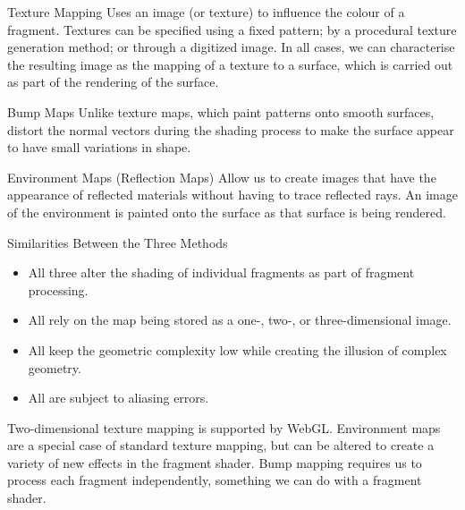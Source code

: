 \documentclass[../COS3712_Notes.tex]{subfiles}
\begin{document}
      \begin{definition}[label={def:texture-mapping}, nameref={Texture~Mapping}]{Texture Mapping}
        Uses an image (or texture) to influence the colour of a fragment.
        Textures can be specified using a fixed pattern; by a procedural texture generation
        method; or through a digitized image.
        In all cases, we can characterise the resulting image as the mapping of a texture
        to a surface, which is carried out as part of the rendering of the surface.
      \end{definition}

      \begin{definition}{Bump Maps}
        Unlike texture maps, which paint patterns onto smooth surfaces,
         distort the normal vectors during the shading process to make the
        surface appear to have small variations in shape.
      \end{definition}

      \begin{definition}{Environment Maps (Reflection Maps)}
        Allow us to create images that have the appearance of reflected materials
        without having to trace reflected rays.
        An image of the environment is painted onto the surface as that surface is being
        rendered.
      \end{definition}

      \begin{sidenote}{Similarities Between the Three Methods}
        $ $\vspace{-1em}
        \begin{itemize}[nosep]
          \item All three alter the shading of individual fragments as part of fragment processing.
          \item All rely on the map being stored as a one-, two-, or three-dimensional image.
          \item All keep the geometric complexity low while creating the illusion of complex
            geometry.
          \item All are subject to aliasing errors.
        \end{itemize}
      \end{sidenote}

      Two-dimensional texture mapping is supported by WebGL.
      Environment maps are a special case of standard texture mapping, but can be altered
      to create a variety of new effects in the fragment shader.
      Bump mapping requires us to process each fragment independently,
      something we can do with a fragment shader.
\end{document}
